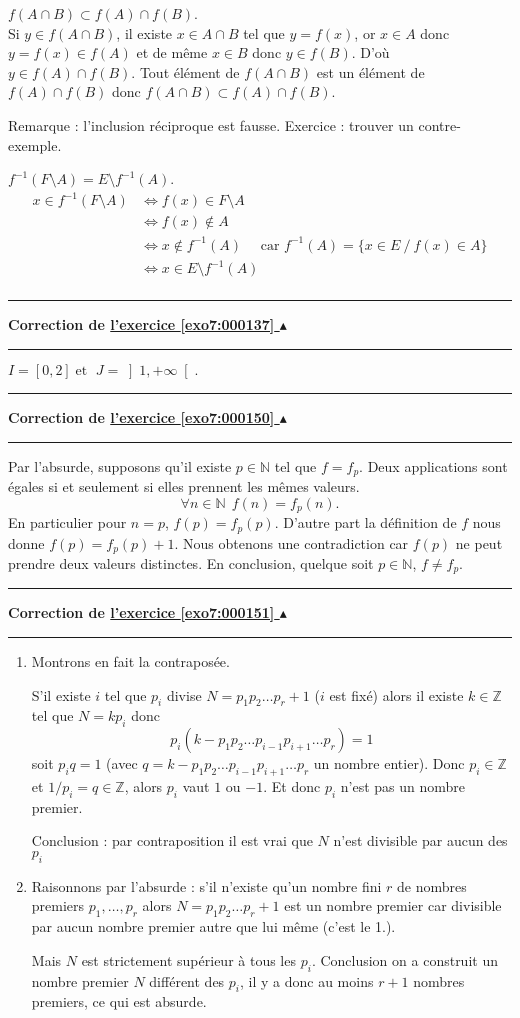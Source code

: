 \documentclass[11pt,a4paper]{article}
\newcommand{\Nn}{\mathbb{N}} \newcommand{\N}{\mathbb{N}}
\newcommand{\Zz}{\mathbb{Z}} \newcommand{\Z}{\mathbb{Z}}
\newcounter{exo}
\newcommand{\correction}[1]{\hypertarget{cor7:#1}{}\label{cor7:#1}{\bf Correction de \hyperlink{exo7:#1}{l'exercice \ref{exo7:#1} $\blacktriangle$}}\vspace{1mm}\hrule\vspace{1mm}}
\newcommand{\fincorrection}{\vspace{1mm}\hrule\vspace*{7mm}}
\begin{document}
$f(A\cap B) \subset f(A)\cap f(B)$.\\
Si $y\in f(A\cap B)$, il existe $x\in A\cap B$ tel que $y=f(x)$,
or $x\in A$ donc $y=f(x) \in f(A)$ et de m\^eme $x\in B$ donc
$y\in f(B)$. D'o\`u $y\in f(A)\cap f(B)$. Tout \'el\'ement de
$f(A\cap B)$ est un \'el\'ement de $f(A)\cap f(B)$ donc $f(A\cap
B) \subset f(A)\cap f(B)$.

Remarque : l'inclusion r\'eciproque est fausse. Exercice : trouver
un contre-exemple.

\bigskip

$f^{-1}(F\setminus A) = E\setminus f^{-1}(A)$.\\
\begin{align*}
x\in f^{-1}(F\setminus A) &\Leftrightarrow f(x) \in F\setminus A\\
&\Leftrightarrow f(x) \notin A\\
&\Leftrightarrow x \notin f^{-1}(A) \quad \text{ car } f^{-1}(A) = \{ x\in E \ / \ f(x) \in A \}\\
&\Leftrightarrow x\in E\setminus f^{-1}(A)\\
\end{align*}
\fincorrection
\correction{000137}
$I=\left[0,2\right]\;\mbox{
et }\;J=\left]1,+\infty\right[.$
\fincorrection
\correction{000150}
Par l'absurde, supposons qu'il existe $p\in \Nn$ tel que $f=f_p$.
Deux applications sont \'egales si et seulement si elles prennent
les m\^emes valeurs.
$$\forall n\in \Nn\ \ f(n) = f_p(n).$$
En particulier pour $n=p$, $f(p)=f_p(p)$. D'autre part la
d\'efinition de $f$ nous donne $f(p) = f_p(p)+1$. Nous obtenons
une contradiction car $f(p)$ ne peut prendre deux valeurs
distinctes. En conclusion, quelque soit $p\in \Nn$, $f\not= f_p$.
\fincorrection
\correction{000151}
\begin{enumerate}
\item
Montrons en fait la contrapos\'ee.

S'il existe $i$ tel que $p_i$ divise $N=p_1p_2 \ldots p_r +1$ ($i$
est fix\'e) alors il existe $k \in \Zz$ tel que $N = kp_i$ donc
$$p_i(k-p_1p_2\ldots p_{i-1}p_{i+1}\ldots p_r) = 1$$
 soit $p_iq = 1$ (avec
$q = k-p_1p_2\ldots p_{i-1}p_{i+1}\ldots p_r $ un nombre entier).
Donc $p_i \in \Zz$ et $1/p_i = q \in \Zz$,  alors $p_i$ vaut $1$
ou $-1$. Et donc $p_i$ n'est pas un nombre premier.

Conclusion : par contraposition il est vrai que $N$ n'est
divisible par aucun des $p_i$

\item Raisonnons par l'absurde : s'il n'existe qu'un nombre fini $r$ de nombres premiers $p_1,\ldots,p_r$
alors $N=p_1p_2 \ldots p_r +1$ est un nombre premier car divisible
par aucun nombre premier autre que lui m\^eme (c'est le 1.).

 Mais $N$ est strictement sup\'erieur \`a tous les $p_i$. Conclusion on a construit un
nombre premier $N$ diff\'erent des $p_i$, il y a donc au moins
$r+1$ nombres premiers, ce qui est absurde.
\end{enumerate}
\end{document}
